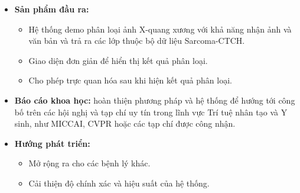 \begin{refsection}
\begin{itemize}
      \item \textbf{Sản phẩm đầu ra:}
      \begin{itemize}
          \item Hệ thống demo phân loại ảnh X-quang xương với khả năng nhận ảnh và văn bản và trả ra các lớp thuộc bộ dữ liệu Sarcoma-CTCH.

          \item Giao diện đơn giản để hiển thị kết quả phân loại.

          \item Cho phép trực quan hóa sau khi hiện kết quả phân loại.
      \end{itemize}

      \item \textbf{Báo cáo khoa học:} hoàn thiện phương pháp và hệ thống để hướng tới công bố trên các hội nghị và tạp chí uy tín trong lĩnh vực Trí tuệ nhân tạo và Y sinh, như MICCAI, CVPR hoặc các tạp chí được công nhận.

      \item \textbf{Hướng phát triển:}
      \begin{itemize}
          \item Mở rộng ra cho các bệnh lý khác.
          \item Cải thiện độ chính xác và hiệu suất của hệ thống.
      \end{itemize}
  \end{itemize}

\clearpage


\end{refsection}
